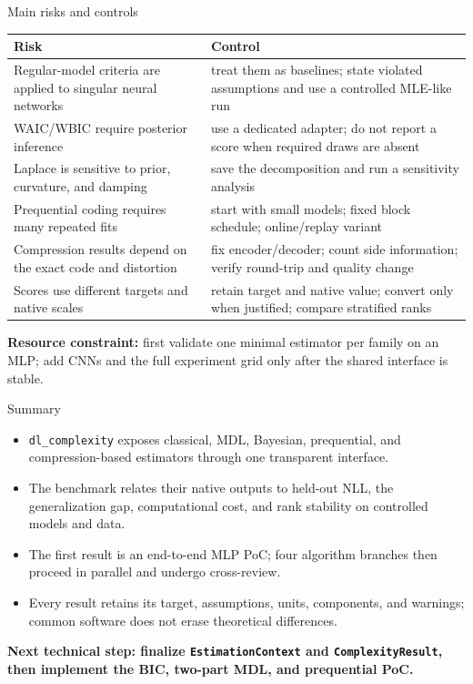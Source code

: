 \documentclass[aspectratio=169,notheorems]{beamer}
\newcommand{\code}[1]{\texttt{#1}}
\newcommand{\take}[1]{%
  \par\vspace{0.35em}{\color{myblue}\hrule height 0.6pt}%
  \vspace{0.25em}\noindent\textbf{#1}\par}
\begin{document}
\begin{frame}[shrink=4]{Main risks and controls}
\small
\renewcommand{\arraystretch}{1.16}
\begin{tabular}{@{}L{0.43\textwidth}L{0.50\textwidth}@{}}
\toprule
\textbf{Risk} & \textbf{Control} \\
\midrule
Regular-model criteria are applied to singular neural networks &
treat them as baselines; state violated assumptions and use a controlled MLE-like run \\
WAIC/WBIC require posterior inference &
use a dedicated adapter; do not report a score when required draws are absent \\
Laplace is sensitive to prior, curvature, and damping &
save the decomposition and run a sensitivity analysis \\
Prequential coding requires many repeated fits &
start with small models; fixed block schedule; online/replay variant \\
Compression results depend on the exact code and distortion &
fix encoder/decoder; count side information; verify round-trip and quality change \\
Scores use different targets and native scales &
retain target and native value; convert only when justified; compare stratified ranks \\
\bottomrule
\end{tabular}

\medskip
\textbf{Resource constraint:} first validate one minimal estimator per family on an MLP;
add CNNs and the full experiment grid only after the shared interface is stable.
\end{frame}

\begin{frame}{Summary}
\begin{itemize}\setlength{\itemsep}{0.7em}
  \item \code{dl\_complexity} exposes classical, MDL, Bayesian, prequential, and
        compression-based estimators through one transparent interface.
  \item The benchmark relates their native outputs to held-out NLL, the generalization
        gap, computational cost, and rank stability on controlled models and data.
  \item The first result is an end-to-end MLP PoC; four algorithm branches then proceed
        in parallel and undergo cross-review.
  \item Every result retains its target, assumptions, units, components, and warnings;
        common software does not erase theoretical differences.
\end{itemize}

\take{Next technical step: finalize \code{EstimationContext} and
\code{ComplexityResult}, then implement the BIC, two-part MDL, and prequential PoC.}
\end{frame}
\end{document}

